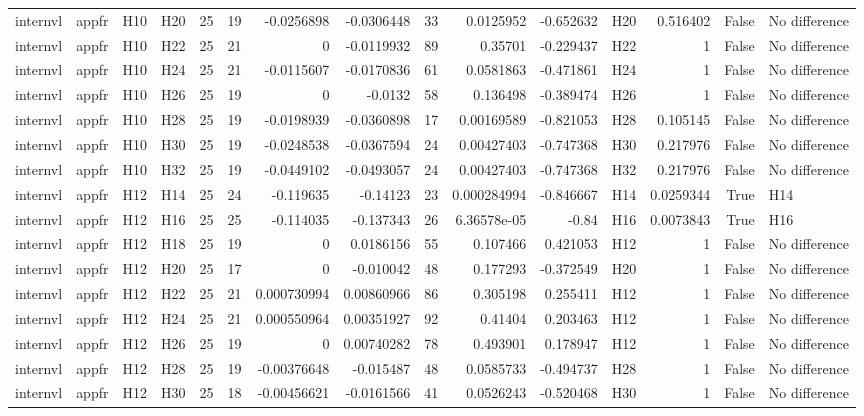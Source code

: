 \begin{longtable}{llllrrrrrrrlrrl}
internvl & appfr & H10 & H20 & 25 & 19 & -0.0256898 & -0.0306448 & 33 & 0.0125952 & -0.652632 & H20 & 0.516402 & False & No difference \\
internvl & appfr & H10 & H22 & 25 & 21 & 0 & -0.0119932 & 89 & 0.35701 & -0.229437 & H22 & 1 & False & No difference \\
internvl & appfr & H10 & H24 & 25 & 21 & -0.0115607 & -0.0170836 & 61 & 0.0581863 & -0.471861 & H24 & 1 & False & No difference \\
internvl & appfr & H10 & H26 & 25 & 19 & 0 & -0.0132 & 58 & 0.136498 & -0.389474 & H26 & 1 & False & No difference \\
internvl & appfr & H10 & H28 & 25 & 19 & -0.0198939 & -0.0360898 & 17 & 0.00169589 & -0.821053 & H28 & 0.105145 & False & No difference \\
internvl & appfr & H10 & H30 & 25 & 19 & -0.0248538 & -0.0367594 & 24 & 0.00427403 & -0.747368 & H30 & 0.217976 & False & No difference \\
internvl & appfr & H10 & H32 & 25 & 19 & -0.0449102 & -0.0493057 & 24 & 0.00427403 & -0.747368 & H32 & 0.217976 & False & No difference \\
internvl & appfr & H12 & H14 & 25 & 24 & -0.119635 & -0.14123 & 23 & 0.000284994 & -0.846667 & H14 & 0.0259344 & True & H14 \\
internvl & appfr & H12 & H16 & 25 & 25 & -0.114035 & -0.137343 & 26 & 6.36578e-05 & -0.84 & H16 & 0.0073843 & True & H16 \\
internvl & appfr & H12 & H18 & 25 & 19 & 0 & 0.0186156 & 55 & 0.107466 & 0.421053 & H12 & 1 & False & No difference \\
internvl & appfr & H12 & H20 & 25 & 17 & 0 & -0.010042 & 48 & 0.177293 & -0.372549 & H20 & 1 & False & No difference \\
internvl & appfr & H12 & H22 & 25 & 21 & 0.000730994 & 0.00860966 & 86 & 0.305198 & 0.255411 & H12 & 1 & False & No difference \\
internvl & appfr & H12 & H24 & 25 & 21 & 0.000550964 & 0.00351927 & 92 & 0.41404 & 0.203463 & H12 & 1 & False & No difference \\
internvl & appfr & H12 & H26 & 25 & 19 & 0 & 0.00740282 & 78 & 0.493901 & 0.178947 & H12 & 1 & False & No difference \\
internvl & appfr & H12 & H28 & 25 & 19 & -0.00376648 & -0.015487 & 48 & 0.0585733 & -0.494737 & H28 & 1 & False & No difference \\
internvl & appfr & H12 & H30 & 25 & 18 & -0.00456621 & -0.0161566 & 41 & 0.0526243 & -0.520468 & H30 & 1 & False & No difference \\

\end{longtable}
